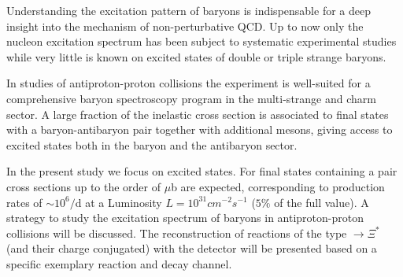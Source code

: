 Understanding the excitation pattern of baryons is indispensable for a deep insight into the mechanism of non-perturbative QCD. 
Up to now only the nucleon excitation spectrum has been subject to systematic experimental studies while very little is known 
on excited states of double or triple strange baryons.

\noindent In studies of antiproton-proton collisions the \panda experiment is well-suited for a comprehensive baryon spectroscopy program
in the multi-strange and charm sector. 
A large fraction of the inelastic \pbarpSystem cross section is associated to final states with a baryon-antibaryon pair together with 
additional mesons, giving access to excited states both in the baryon and the antibaryon sector.

\noindent In the present study we focus on excited \cascade states. For final states containing a \cascade\anticascade pair cross sections 
up to the order of $\mu$b are expected, corresponding to production rates of $\sim 10^6/$d at a Luminosity $L=10^{31} \unit{cm}^{-2} \unit{s}^{-1}$
 ($5\%$ of the full value).
A strategy to study the excitation spectrum of \cascade baryons in antiproton-proton collisions will be discussed. The reconstruction of 
reactions of the type \pbarpSystem $\rightarrow \Xi^{*}$ \anticascade (and their charge conjugated) with the \panda detector will be presented 
based on a specific exemplary reaction and decay channel.